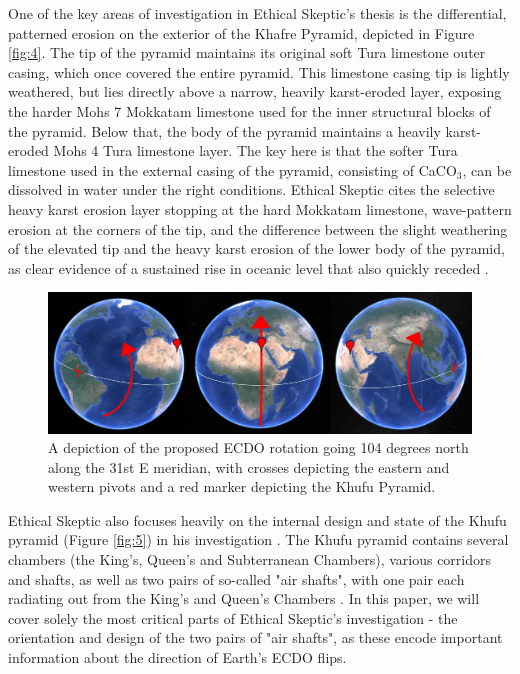 \documentclass[10pt,twocolumn,letterpaper]{article}
\begin{document}
One of the key areas of investigation in Ethical Skeptic's thesis is the differential, patterned erosion on the exterior of the Khafre Pyramid, depicted in Figure \ref{fig:4}. The tip of the pyramid maintains its original soft Tura limestone outer casing, which once covered the entire pyramid. This limestone casing tip is lightly weathered, but lies directly above a narrow, heavily karst-eroded layer, exposing the harder Mohs 7 Mokkatam limestone used for the inner structural blocks of the pyramid. Below that, the body of the pyramid maintains a heavily karst-eroded Mohs 4 Tura limestone layer. The key here is that the softer Tura limestone used in the external casing of the pyramid, consisting of CaCO$_3$, can be dissolved in water under the right conditions. Ethical Skeptic cites the selective heavy karst erosion layer stopping at the hard Mokkatam limestone, wave-pattern erosion at the corners of the tip, and the difference between the slight weathering of the elevated tip and the heavy karst erosion of the lower body of the pyramid, as clear evidence of a sustained rise in oceanic level that also quickly receded \cite{27}.

\begin{figure}[b]
\begin{center}
\includegraphics[width=1\textwidth]{drawing.jpg}
\end{center}
   \caption{A depiction of the proposed ECDO rotation going 104 degrees north along the 31st E meridian, with crosses depicting the eastern and western pivots and a red marker depicting the Khufu Pyramid.}
\label{fig:6}
\end{figure}

Ethical Skeptic also focuses heavily on the internal design and state of the Khufu pyramid (Figure \ref{fig:5}) in his investigation \cite{28}. The Khufu pyramid contains several chambers (the King's, Queen's and Subterranean Chambers), various corridors and shafts, as well as two pairs of so-called "air shafts", with one pair each radiating out from the King's and Queen's Chambers \cite{29,30}. In this paper, we will cover solely the most critical parts of Ethical Skeptic's investigation - the orientation and design of the two pairs of "air shafts", as these encode important information about the direction of Earth's ECDO flips.
\end{document}
